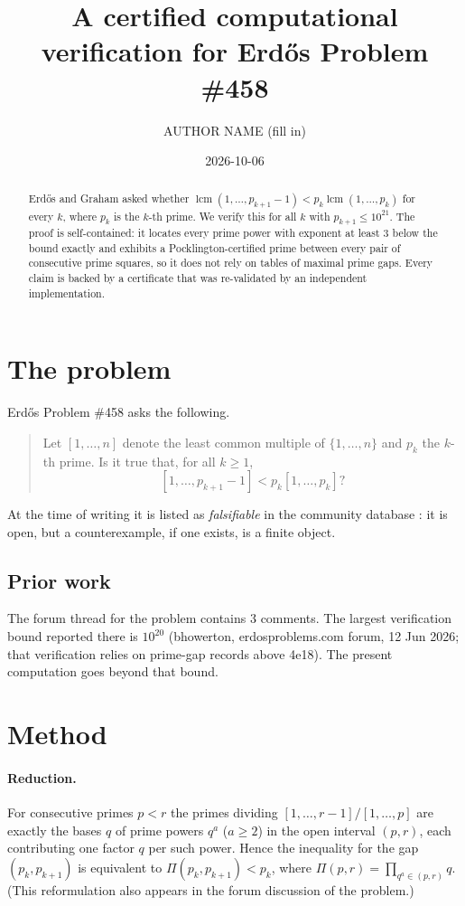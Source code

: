 \documentclass[11pt]{amsart}
\title{A certified computational verification for Erd\H{o}s Problem \#458}
\author{AUTHOR NAME (fill in)}
\date{2026-10-06}
\begin{document}
\begin{abstract}
Erd\H{o}s and Graham asked whether $\operatorname{lcm}(1,\ldots,p_{k+1}-1)<p_k\operatorname{lcm}(1,\ldots,p_k)$ for every $k$, where $p_k$ is the $k$-th prime. We verify this for all $k$ with $p_{k+1}\le 10^{21}$. The proof is self-contained: it locates every prime power with exponent at least $3$ below the bound exactly and exhibits a Pocklington-certified prime between every pair of consecutive prime squares, so it does not rely on tables of maximal prime gaps. Every claim is backed by a certificate that was re-validated by an independent implementation.
\end{abstract}
\maketitle

\section{The problem}
Erd\H{o}s Problem \#458 \cite{erdosproblems458} asks the following.
\begin{quote}
Let $[1,\ldots,n]$ denote the least common multiple of $\{1,\ldots,n\}$ and $p_k$ the $k$-th prime. Is it true that, for all $k\geq 1$, \[[1,\ldots,p_{k+1}-1]< p_k[1,\ldots,p_k]?\]
\end{quote}
At the time of writing it is listed as \emph{falsifiable} in the community
database \cite{ErdosDB}: it is open, but a counterexample, if one exists, is a finite object.

\subsection*{Prior work}
The forum thread for the problem contains 3 comments. The largest verification bound reported there is $10^{20}$ (bhowerton, erdosproblems.com forum, 12 Jun 2026; that verification relies on prime-gap records above 4e18). The present computation goes beyond that bound.

\section{Method}

\paragraph{Reduction.} For consecutive primes $p<r$ the primes dividing
$[1,\ldots,r-1]/[1,\ldots,p]$ are exactly the bases $q$ of prime powers
$q^a$ ($a\ge 2$) in the open interval $(p,r)$, each contributing one factor
$q$ per such power. Hence the inequality for the gap $(p_k,p_{k+1})$ is
equivalent to $\Pi(p_k,p_{k+1})<p_k$, where $\Pi(p,r)=\prod_{q^a\in(p,r)}q$.
(This reformulation also appears in the forum discussion of the problem.)
\end{document}
